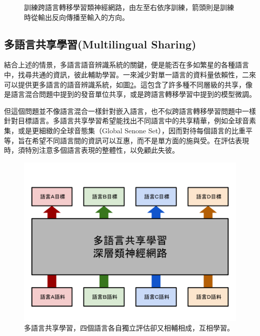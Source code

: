 \begin{figure}
\caption{訓練跨語言轉移學習類神經網路，由左至右依序訓練，箭頭則是訓練時從輸出反向傳播至輸入的方向。}
\label{fig:chap2_cross}
\end{figure}


\subsection{多語言共享學習(Multilingual Sharing)}
結合上述的情景，多語言語音辨識系統的關鍵，便是能否在多如繁星的各種語言中，找尋共通的資訊，彼此輔助學習\cite{vu2014multilingual}。一來減少對單一語言的資料量依賴性，二來可以提供更多語言的語音辨識系統，如圖\ref{fig:chap2_multilingual}。這包含了許多種不同層級的共享，像是語言混合問題中提到的發音單位共享，或是跨語言轉移學習中提到的模型微調。

但這個問題並不像語言混合一樣針對嵌入語言，也不似跨語言轉移學習問題中一樣針對目標語言。多語言共享學習希望能找出不同語言中的共享精華，例如全球音素集，或是更細緻的全球音態集（Global Senone Set），因而對待每個語言的比重平等，旨在希望不同語言間的資訊可以互惠，而不是單方面的施與受。在評估表現時，須特別注意多個語言表現的整體性，以免顧此失彼。

\begin{figure}
\centering
\includegraphics[scale=0.4]{images/chap2_multilingual}
\caption{多語言共享學習，四個語言各自獨立評估卻又相輔相成，互相學習。}
\label{fig:chap2_multilingual}
\end{figure}
